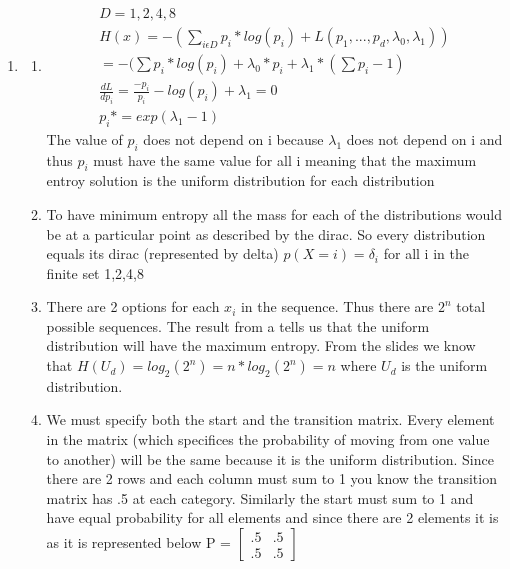 \documentclass{article}
\begin{document}
	\maketitle
	\begin{enumerate}
		\item
		\begin{enumerate}
			\item 
				\begin{gather*}
					D = {1,2,4,8} \\
					H(x) = -(\sum_{i \epsilon D} p_{i}*log(p_{i})+ L(p_{1},...,p_{d}, \lambda_{0}, \lambda_{1})) \\
					= -(\sum p_{i}*log(p_{i})+ \lambda_{0}*p_{i} + \lambda_{1}*(\sum p_{i}-1) \\
					\frac{dL}{dp_{i}} = \frac{-p_{i}}{p_{i}}-log(p_{i}) +\lambda_{1}=0 \\
					p_{i}* = exp( \lambda_{1}-1)
				\end{gather*}
				The value of $p_{i}$ does not depend on i because $ \lambda_{1}$ does not depend on i and thus $p_{i}$ must have the same value for all i meaning that the maximum entroy solution is the uniform distribution for each distribution
			\item
				To have minimum entropy all the mass for each of the distributions would be at a particular point as described by the dirac. So every distribution equals its dirac (represented by delta) $p(X=i) = \delta_{i} $ for all i in the finite set {1,2,4,8}
			\item
				There are 2 options for each $x_{i}$ in the sequence. Thus there are $2^{n}$ total possible sequences. The result from a tells us that the uniform distribution will have the maximum entropy. From the slides we know that $H(U_{d}) = log_{2}(2^{n}) = n*log_{2}(2^{n}) = n$ where $U_{d}$ is the uniform distribution.
			\item
				We must specify both the start and the transition matrix. Every element in the matrix (which specifices the probability of moving from one value to another) will be the same because it is the uniform distribution. Since there are 2 rows and each column must sum to 1 you know the transition matrix has .5 at each category. Similarly the start must sum to 1 and have equal probability for all elements and since there are 2 elements it is as it is represented below \newline
				P = $\begin{bmatrix}
				.5 & .5 \\
				.5 & .5 
				\end{bmatrix}$ \newline

\end{enumerate}
\end{enumerate}
\end{document}
